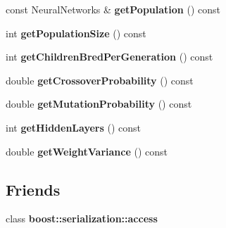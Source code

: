\begin{DoxyCompactItemize}
\item 
const Neural\+Networks \& {\bfseries get\+Population} () const \hypertarget{classEvolutionaryAlgorithm_a97ed735aa801a51f23907eafb7c53637}{}\label{classEvolutionaryAlgorithm_a97ed735aa801a51f23907eafb7c53637}

\item 
int {\bfseries get\+Population\+Size} () const \hypertarget{classEvolutionaryAlgorithm_ac024638cfcde77429db547b329dfe56b}{}\label{classEvolutionaryAlgorithm_ac024638cfcde77429db547b329dfe56b}

\item 
int {\bfseries get\+Children\+Bred\+Per\+Generation} () const \hypertarget{classEvolutionaryAlgorithm_a014905a4ac30a361cda30a63479e5dd3}{}\label{classEvolutionaryAlgorithm_a014905a4ac30a361cda30a63479e5dd3}

\item 
double {\bfseries get\+Crossover\+Probability} () const \hypertarget{classEvolutionaryAlgorithm_ad284d6b6bcb6b1278f0d67ed53241901}{}\label{classEvolutionaryAlgorithm_ad284d6b6bcb6b1278f0d67ed53241901}

\item 
double {\bfseries get\+Mutation\+Probability} () const \hypertarget{classEvolutionaryAlgorithm_a80d717262bfe9fa36151750619cd2e85}{}\label{classEvolutionaryAlgorithm_a80d717262bfe9fa36151750619cd2e85}

\item 
int {\bfseries get\+Hidden\+Layers} () const \hypertarget{classEvolutionaryAlgorithm_a2bc50ae3e41c3874fc8d1dfb054e365b}{}\label{classEvolutionaryAlgorithm_a2bc50ae3e41c3874fc8d1dfb054e365b}

\item 
double {\bfseries get\+Weight\+Variance} () const \hypertarget{classEvolutionaryAlgorithm_aa575d0aa5378fb0cbde7d35fc2b61b93}{}\label{classEvolutionaryAlgorithm_aa575d0aa5378fb0cbde7d35fc2b61b93}

\end{DoxyCompactItemize}
\subsection*{Friends}
\begin{DoxyCompactItemize}
\item 
class {\bfseries boost\+::serialization\+::access}\hypertarget{classEvolutionaryAlgorithm_ac98d07dd8f7b70e16ccb9a01abf56b9c}{}\label{classEvolutionaryAlgorithm_ac98d07dd8f7b70e16ccb9a01abf56b9c}

\end{DoxyCompactItemize}


